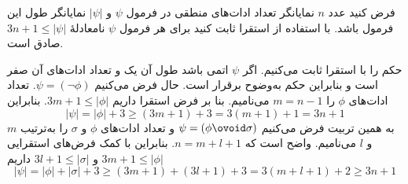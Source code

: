 فرض کنید عدد $n$ نمایانگر تعداد ادات‌های منطقی در فرمول $\psi$ و $|\psi|$ نمایانگر طول این فرمول باشد. با استفاده از استقرا ثابت کنید برای هر فرمول $\psi$ نامعادلهٔ
$3n+1\leq|\psi|$ صادق است.
\begin{ans}
حکم را با استقرا ثابت می‌کنیم. اگر $\psi$ اتمی باشد طول آن یک و تعداد ادات‌های آن صفر است و بنابراین حکم به‌وضوح برقرار است. حال فرض می‌کنیم
$\psi=(\neg\phi)$.
تعداد ادات‌های $\phi$ را $m=n-1$ می‌نامیم. بنا بر فرض استقرا داریم
$3m+1\leq|\phi|$.
بنابراین
$$
|\psi|=|\phi|+3\geq(3m+1)+3=3(m+1)+1=3n+1
$$
به همین تربیت فرض می‌کنیم
$\psi=(\phi\ovoid\sigma)$
و تعداد ادات‌های $\phi$ و $\sigma$ را به‌ترتیب $m$ و $l$ می‌نامیم. واضح است که $n=m+l+1$. بنابراین با کمک فرض‌های استقرایی
$3m+1\leq|\phi|$
و
$3l+1\leq|\sigma|$
داریم
$$|\psi|=|\phi|+|\sigma|+3\geq(3m+1)+(3l+1)+3=3(m+l+1)+2\geq3n+1$$
\end{ans}
